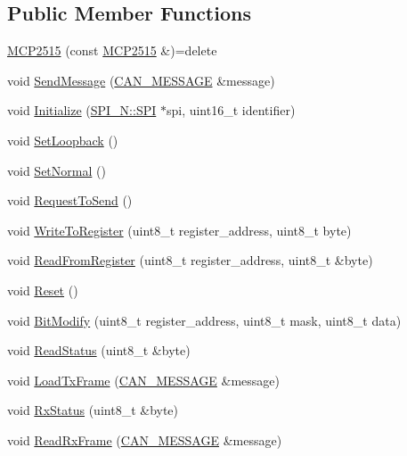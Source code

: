 \subsection*{Public Member Functions}
\begin{DoxyCompactItemize}
\item 
\hyperlink{class_m_c_p2515_a8cd4111604b740feb758bd4d077f4fb8}{M\+C\+P2515} (const \hyperlink{class_m_c_p2515}{M\+C\+P2515} \&)=delete
\item 
void \hyperlink{class_m_c_p2515_aa8c9fe944f7e6e99feb3f56a1c099a29}{Send\+Message} (\hyperlink{struct_c_a_n___m_e_s_s_a_g_e}{C\+A\+N\+\_\+\+M\+E\+S\+S\+A\+GE} \&message)
\item 
void \hyperlink{class_m_c_p2515_a60a93ccc1a0b21caaba5fda5f88117d2}{Initialize} (\hyperlink{class_s_p_i___n_1_1_s_p_i}{S\+P\+I\+\_\+\+N\+::\+S\+PI} $\ast$spi, uint16\+\_\+t identifier)
\item 
void \hyperlink{class_m_c_p2515_a7aac5fdb713b83933391348f1188f2b9}{Set\+Loopback} ()
\item 
void \hyperlink{class_m_c_p2515_a58601a9d30863ebac441d641ddfac44e}{Set\+Normal} ()
\item 
void \hyperlink{class_m_c_p2515_a5a218199ca1dfcb25cb95890bc0220fc}{Request\+To\+Send} ()
\item 
void \hyperlink{class_m_c_p2515_adbc005a5975b77b0aef74363f3832f9b}{Write\+To\+Register} (uint8\+\_\+t register\+\_\+address, uint8\+\_\+t byte)
\item 
void \hyperlink{class_m_c_p2515_a09ef6973daccbf868d89986e727cfa1b}{Read\+From\+Register} (uint8\+\_\+t register\+\_\+address, uint8\+\_\+t \&byte)
\item 
void \hyperlink{class_m_c_p2515_aa4d4138b984dc87116cf72ae104acb70}{Reset} ()
\item 
void \hyperlink{class_m_c_p2515_aa9a35fe139adf1fccaaceec561544c14}{Bit\+Modify} (uint8\+\_\+t register\+\_\+address, uint8\+\_\+t mask, uint8\+\_\+t data)
\item 
void \hyperlink{class_m_c_p2515_ae466f10eea5ccf0f36439757d4baf6b5}{Read\+Status} (uint8\+\_\+t \&byte)
\item 
void \hyperlink{class_m_c_p2515_a37771e54c401a0d11b16599f4a3b85df}{Load\+Tx\+Frame} (\hyperlink{struct_c_a_n___m_e_s_s_a_g_e}{C\+A\+N\+\_\+\+M\+E\+S\+S\+A\+GE} \&message)
\item 
void \hyperlink{class_m_c_p2515_af6853f82074a0be19d5a0516a959515e}{Rx\+Status} (uint8\+\_\+t \&byte)
\item 
void \hyperlink{class_m_c_p2515_a2035c6707e66a98d92003a3fc99aa784}{Read\+Rx\+Frame} (\hyperlink{struct_c_a_n___m_e_s_s_a_g_e}{C\+A\+N\+\_\+\+M\+E\+S\+S\+A\+GE} \&message)
\end{DoxyCompactItemize}
